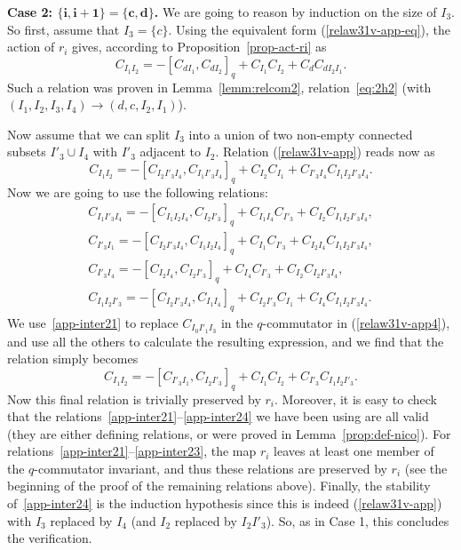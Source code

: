 \documentclass[pdftex]{sigma}
\numberwithin{equation}{section}
\theoremstyle{definition}
\begin{document}
\textbf{Case 2: $\boldsymbol{\{i,i+1\}=\{c,d\}}$.} We are going to reason by induction on the size of $I_3$. So first, assume that $I_3=\{c\}$. Using the equivalent form (\ref{relaw31v-app-eq}), the action of $r_i$ gives, according to Proposition~\ref{prop-act-ri} as
\[C_{I_1I_2}=-[C_{dI_1},C_{dI_2}]_q+C_{I_1}C_{I_2}+C_{d}C_{dI_2I_1} .\]
Such a relation was proven in Lemma~\ref{lemm:relcom2}, relation~\eqref{eq:2h2} (with $(I_1,I_2,I_3,I_4)\to (d,c,I_2,I_1)$).

Now assume that we can split $I_3$ into a union of two non-empty connected subsets $I'_3\cup I_4$ with $I'_3$ adjacent to $I_2$. Relation (\ref{relaw31v-app}) reads now as
\begin{equation}\label{relaw31v-app4}C_{I_1I_2}=-[C_{I_2I'_3I_4},C_{I_1I'_3I_4}]_q+C_{I_2}C_{I_1}+C_{I'_3I_4}C_{I_1I_2I'_3I_4} .
\end{equation}
Now we are going to use the following relations:
 \begin{gather}
C_{I_1I'_3I_4} =-[C_{I_1I_2I_4},C_{I_2I'_3}]_q+C_{I_1I_4}C_{I'_3}+C_{I_2}C_{I_1I_2I'_3I_4} , \label{app-inter21} \\
C_{I'_3I_1} =-[C_{I_2I'_3I_4},C_{I_1I_2I_4}]_q+C_{I_1}C_{I'_3}+C_{I_2I_4}C_{I_1I_2I'_3I_4} ,\label{app-inter22} \\
C_{I'_3I_4} =-[C_{I_2I_4},C_{I_2I'_3}]_q+C_{I_4}C_{I'_3}+C_{I_2}C_{I_2I'_3I_4} ,\label{app-inter23}\\
C_{I_1I_2I'_3} =-[C_{I_2I'_3I_4}, C_{I_1I_4}]_q +C_{I_2I'_3}C_{I_1}+C_{I_4}C_{I_1I_2I'_3I_4} .\label{app-inter24}
 \end{gather}
We use~\eqref{app-inter21} to replace $C_{I_0I'_1I_3}$ in the $q$-commutator in (\ref{relaw31v-app4}), and use all the others to calculate the resulting expression, and we find that the relation simply becomes
\begin{equation*}%
C_{I_1I_2}=-[C_{I'_3I_1},C_{I_2I'_3}]_q+C_{I_1}C_{I_2}+C_{I'_3}C_{I_1I_2I'_3} .
\end{equation*}
Now this final relation is trivially preserved by $r_i$. Moreover, it is easy to check that the relations~\eqref{app-inter21}--\eqref{app-inter24} we have been using are all valid (they are either defining relations, or were proved in Lemma~\ref{prop:def-nico}). For relations~\eqref{app-inter21}--\eqref{app-inter23}, the map $r_i$ leaves at least one member of the $q$-commutator invariant, and thus these relations are preserved by $r_i$ (see the beginning of the proof of the remaining relations above). Finally, the stability of~\eqref{app-inter24} is the induction hypothesis since this is indeed (\ref{relaw31v-app}) with $I_3$ replaced by $I_4$ (and $I_2$ replaced by $I_2I'_3$). So, as in Case 1, this concludes the verification.
\end{document}
